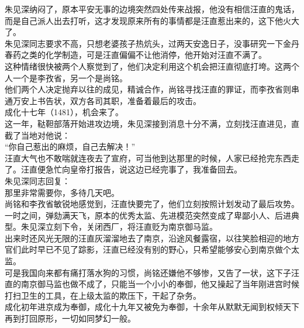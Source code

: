 \begin{multicols}{\theparacolNo}
朱见深纳闷了，原本平安无事的边境突然四处传来战报，他没有相信汪直的鬼话，而是自己派人出去打听，这才发现原来所有的事情都是汪直惹出来的，这下他火大了。\\

朱见深同志要求不高，只想老婆孩子热炕头，过两天安逸日子，没事研究一下金丹春药之类的化学制造，可是汪直偏偏不让他消停，他开始对汪直不满了。\\

这种情绪很快被两个人察觉到了，他们决定利用这个机会把汪直彻底打垮。这两个人一个是李孜省，另一个是尚铭。\\

他们两个人决定抛弃以往的成见，精诚合作，尚铭寻找汪直的罪证，而李孜省则串通万安上书告状，双方各司其职，准备着最后的攻击。\\

成化十七年（1481），机会来了。\\

这一年，鞑靼部落开始进攻边境，朱见深接到消息十分不满，立刻找汪直进见，直截了当地对他说：\\

“你自己惹出的麻烦，自己去解决！”\\

汪直大气也不敢喘就连夜去了宣府，可当他到达那里的时候，人家已经抢完东西走了。汪直便急忙向皇帝打报告，说这边已经完事了，我准备回去。\\

朱见深同志回复：\\

那里非常需要你，多待几天吧。\\

尚铭和李孜省敏锐地感觉到，汪直快要完了，他们立刻按照计划发动了最后攻势。一时之间，弹劾满天飞，原本的优秀太监、先进模范突然变成了卑鄙小人、后进典型。朱见深立刻下令，关闭西厂，将汪直贬为南京御马监。\\

出来时还风光无限的汪直灰溜溜地去了南京，沿途风餐露宿，以往笑脸相迎的地方官们此时早已不见了踪影，汪直已经没有别的野心，只希望能够安心到南京做个太监。\\

可是我国向来都有痛打落水狗的习惯，尚铭还嫌他不够惨，又告了一状，这下子汪直的南京御马监也做不成了，只能当一个小小的奉御，他又操起了当年刚进宫时候打扫卫生的工具，在上级太监的欺压下，干起了杂务。\\

成化初年进京成为奉御，成化十九年又被免为奉御，十余年从默默无闻到权倾天下再到打回原形，一切如同梦幻一般。\\


\end{multicols}
